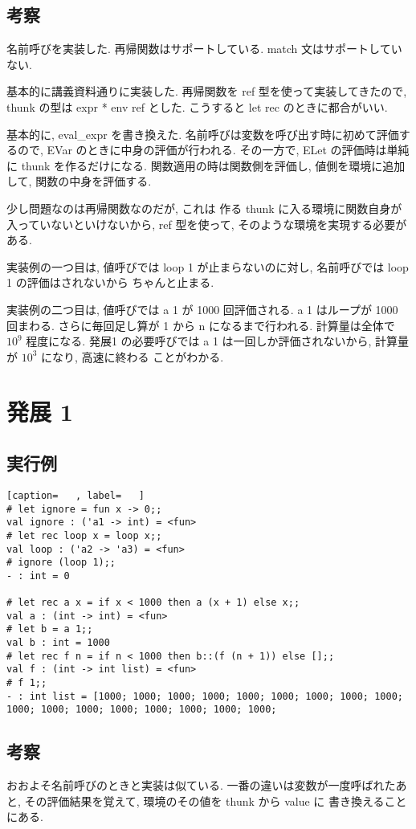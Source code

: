\documentclass[dvipdfmx]{jsarticle}
\begin{document}
\subsection*{考察}
名前呼びを実装した.
再帰関数はサポートしている.
match 文はサポートしていない.

基本的に講義資料通りに実装した.
再帰関数を ref 型を使って実装してきたので,
thunk の型は expr * env ref とした.
こうすると let rec のときに都合がいい.

基本的に, eval\_expr を書き換えた.
名前呼びは変数を呼び出す時に初めて評価するので,
EVar のときに中身の評価が行われる.
その一方で, ELet の評価時は単純に thunk を作るだけになる.
関数適用の時は関数側を評価し, 値側を環境に追加して, 関数の中身を評価する.

少し問題なのは再帰関数なのだが, これは
作る thunk に入る環境に関数自身が入っていないといけないから,
ref 型を使って, そのような環境を実現する必要がある.

実装例の一つ目は, 値呼びでは loop 1 が止まらないのに対し, 名前呼びでは loop 1 の評価はされないから
ちゃんと止まる.

実装例の二つ目は, 値呼びでは a 1 が 1000 回評価される. a 1 はループが 1000 回まわる.
さらに毎回足し算が 1 から n になるまで行われる. 計算量は全体で $10^9$ 程度になる.
発展1 の必要呼びでは a 1 は一回しか評価されないから, 計算量が $10^3$ になり, 高速に終わる
ことがわかる.




\newpage
\section*{発展 1}
\subsection*{実行例}
\begin{lstlisting}[caption=   , label=   ]
# let ignore = fun x -> 0;;
val ignore : ('a1 -> int) = <fun>
# let rec loop x = loop x;;
val loop : ('a2 -> 'a3) = <fun>
# ignore (loop 1);;
- : int = 0

# let rec a x = if x < 1000 then a (x + 1) else x;;
val a : (int -> int) = <fun>
# let b = a 1;;
val b : int = 1000
# let rec f n = if n < 1000 then b::(f (n + 1)) else [];;
val f : (int -> int list) = <fun>
# f 1;;
- : int list = [1000; 1000; 1000; 1000; 1000; 1000; 1000; 1000; 1000; 1000; 1000; 1000; 1000; 1000; 1000; 1000; 1000;
\end{lstlisting}
\subsection*{考察}
おおよそ名前呼びのときと実装は似ている.
一番の違いは変数が一度呼ばれたあと, その評価結果を覚えて, 環境のその値を thunk から value に
書き換えることにある.
\end{document}
